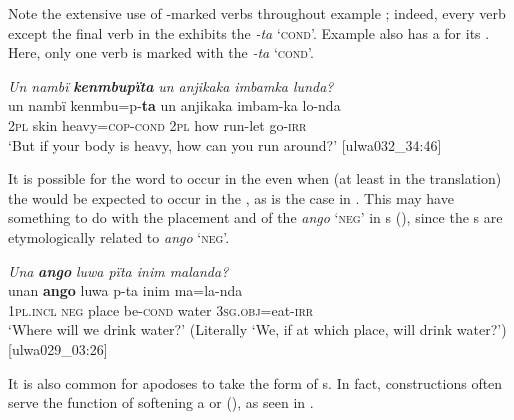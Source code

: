 Note the extensive use of -marked verbs throughout example ; indeed, every verb except the final  verb in the  exhibits the   \textit{-ta} ‘\textsc{cond}’. Example  also has a  for its . Here, only one verb is marked with the  \textit{-ta} ‘\textsc{cond}’.

\ea%
    \label{ex:syntax:260}
          \textit{Un nambï} \textbf{\textit{kenmbupïta}} \textit{un anjikaka imbamka lunda?}\\
\gll un  nambï  kenmbu=p-\textbf{ta}    un  anjikaka  imbam-ka  lo-nda\\
    2\textsc{pl}  skin  heavy=\textsc{cop{}-cond} 2\textsc{pl}  how    run-let    go-\textsc{irr}\\
\glt `But if your body is heavy, how can you run around?’ [ulwa032\_34:46]
\z

It is possible for the  word to occur in the  even when (at least in the  translation) the  would be expected to occur in the , as is the case in . This may have something to do with the placement and  of the  \textit{ango} ‘\textsc{neg}’ in s (), since the s are etymologically related to \textit{ango} ‘\textsc{neg}’.

\ea%
    \label{ex:syntax:261}
          \textit{Una} \textbf{\textit{ango}} \textit{luwa pïta inim malanda?}\\
\gll    unan    \textbf{ango}  luwa  p-ta    inim  ma=la-nda\\
    1\textsc{pl.incl}  \textsc{neg}  place  be\textsc{{}-cond} water  3\textsc{sg.obj}=eat-\textsc{irr}\\
\glt `Where will we drink water?’ (Literally ‘We, if at which place, will drink water?’) [ulwa029\_03:26]
\z

It is also common for  apodoses to take the form of s. In fact,  constructions often serve the  function of softening a  or  (), as seen in .

\newpage

